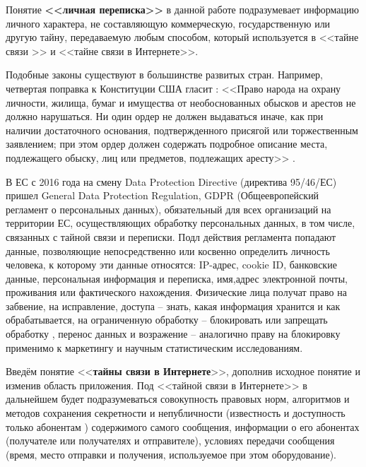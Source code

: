 Понятие \textbf{<<личная переписка>>} в данной работе  подразумевает информацию личного характера, не составляющую коммерческую, государственную или другую тайну, передаваемую любым способом,  который  используется   в <<тайне связи >> и <<тайне связи в Интернете>>.

Подобные законы существуют в большинстве развитых стран. Например, четвертая поправка  к Конституции США  гласит : <<Право народа на охрану личности, жилища, бумаг и имущества от необоснованных обысков и арестов не должно нарушаться. Ни один ордер не должен выдаваться иначе, как при наличии достаточного основания, подтвержденного присягой или торжественным заявлением; при этом ордер должен содержать подробное описание места, подлежащего обыску, лиц или предметов, подлежащих аресту>> \cite{4Popravka}.%


В ЕС  с 2016 года  на смену Data Protection Directive (директива 95/46/ЕС) пришел General Data Protection Regulation, GDPR (Общеевропейский регламент о персональных данных), обязательный для всех организаций на территории ЕС, осуществляющих  обработку персональных данных, в том числе, связанных с тайной связи и переписки.   Подл действия регламента попадают данные, позволяющие непосредственно или косвенно определить личность человека, к которому эти данные относятся: IP-адрес, cookie ID, банковские данные, персональная информация и переписка, имя,адрес электронной почты, проживания или фактического нахождения. Физические лица получат право на забвение, на исправление, доступа -- знать, какая информация хранится и как обрабатывается, на ограниченную обработку -- блокировать или запрещать обработку , перенос данных и возражение -- аналогично праву на блокировку применимо к маркетингу и научным статистическим исследованиям\cite{EUDataProtec}.



Введём понятие <<\textbf{тайны связи в Интернете}>>, дополнив исходное понятие и изменив область приложения. Под <<тайной связи в Интернете>> в дальнейшем будет подразумеваться совокупность правовых норм, алгоритмов и методов сохранения секретности и  непубличности (известность и доступность только абонентам ) содержимого самого сообщения, информации о его абонентах (получателе или получателях и отправителе), условиях передачи сообщения (время, место отправки и получения, используемое при этом оборудование). 

